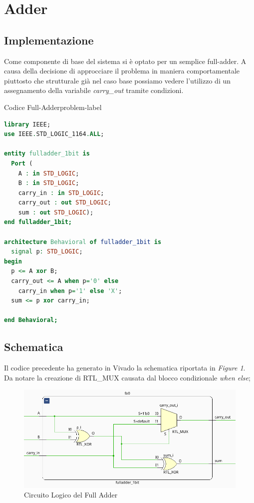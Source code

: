 \section{Adder}
\subsection{Implementazione}
Come componente di base del sistema si è optato per un semplice full-adder. A causa della decisione di approcciare il problema in maniera comportamentale piuttosto che strutturale già nel caso base possiamo vedere l'utilizzo di un assegnamento della variabile \textit{carry\_out} tramite condizioni.

\begin{problem}{Codice Full-Adder}{problem-label}
\begin{lstlisting}[language=VHDL]
library IEEE;
use IEEE.STD_LOGIC_1164.ALL;

entity fulladder_1bit is
  Port ( 
    A : in STD_LOGIC;
    B : in STD_LOGIC;
    carry_in : in STD_LOGIC;
    carry_out : out STD_LOGIC;
    sum : out STD_LOGIC);
end fulladder_1bit;

architecture Behavioral of fulladder_1bit is
  signal p: STD_LOGIC;
begin
  p <= A xor B;
  carry_out <= A when p='0' else
    carry_in when p='1' else 'X';
  sum <= p xor carry_in;

end Behavioral;

\end{lstlisting}
\end{problem}
\newpage
\subsection{Schematica}
Il codice precedente ha generato in Vivado la schematica riportata in \textit{Figure 1}. Da notare la creazione di RTL\_MUX causata dal blocco condizionale \textit{when else};

\begin{figure}[h]
    \centering
    \includegraphics[width=15cm]{resources/fulladder.png}
    \caption{Circuito Logico del Full Adder}
    \label{fig:logic_circuit_fulladder}
\end{figure}


